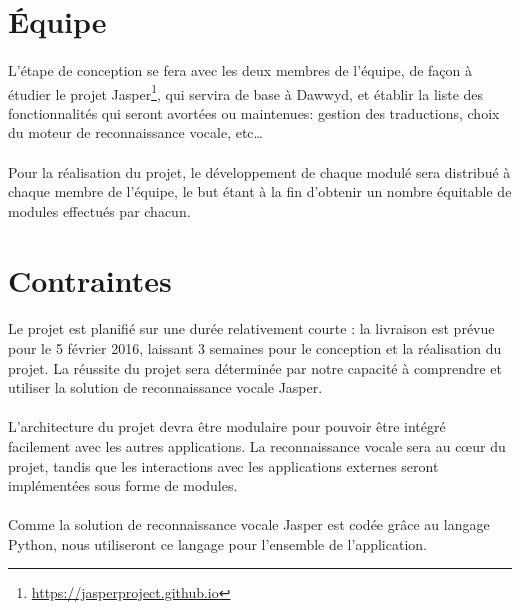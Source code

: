 \documentclass[12pt]{article}
\begin{document}
    \section{Équipe}

\paragraph{}
L'étape de conception se fera avec les deux membres de l'équipe, de façon à
étudier le projet Jasper\footnote{\url{https://jasperproject.github.io}}, qui
servira de base à Dawwyd, et établir la liste des fonctionnalités qui seront
avortées ou maintenues: gestion des traductions, choix du moteur de
reconnaissance vocale, etc\dots

\paragraph{}
Pour la réalisation du projet, le développement de chaque modulé sera
distribué à chaque membre de l'équipe, le but étant à la fin d'obtenir un
nombre équitable de modules effectués par chacun.

    \section{Contraintes}

\paragraph{}
Le projet est planifié sur une durée relativement courte : la livraison
est prévue pour le 5 février 2016, laissant 3 semaines pour le conception et la
réalisation du projet. La réussite du projet sera déterminée par notre capacité
à comprendre et utiliser la solution de reconnaissance vocale
Jasper.

\paragraph{}
L'architecture du projet devra être modulaire pour pouvoir être intégré
facilement avec les autres applications. La reconnaissance vocale sera au
cœur du projet, tandis que les interactions avec les applications externes
seront implémentées sous forme de modules.

\paragraph{}
Comme la solution de reconnaissance vocale Jasper est codée grâce au langage
Python, nous utiliseront ce langage pour l'ensemble de l'application.
\end{document}
